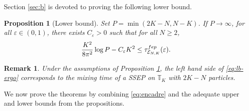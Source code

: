 \documentclass[11pt,a4paper]{article}
\newcommand{\T}{\mathbb{T}}
\newcommand{\FEP}{\textsc{fep}}
\newtheorem{proposition}[theorem]{Proposition}
\newtheorem{remark}{Remark}[section]
\newcommand{\eqs}[1]{\begin{equation}#1\end{equation}}
\begin{document}
Section \ref{sec:b} is devoted to proving the following lower bound.

\begin{proposition}[Lower bound] \label{prop:LB}
Set $P = \min(2K-N,N-K)$. If $P \to \infty$, for all $\varepsilon \in (0,1)$, there exists $C_\varepsilon >0$ such that for all $N \ge 2$, 
\eqs{\label{eq:lb-ergo}\frac{K^2}{8\pi^2}  \log P  - C_\varepsilon K^2  \le \tau_{\mathcal{E}_{N,K} }^{\FEP}(\varepsilon).}
\end{proposition}

\begin{remark}
Under the assumptions of Proposition \ref{prop:LB}, the left hand side of \eqref{eq:lb-ergo} corresponds to the mixing time of a SSEP on $\T_K$ with $2K-N$ particles.
\end{remark}
We now prove the theorems by combining \eqref{eq:encadre} and the adequate upper and lower bounds from the propositions.
\end{document}
